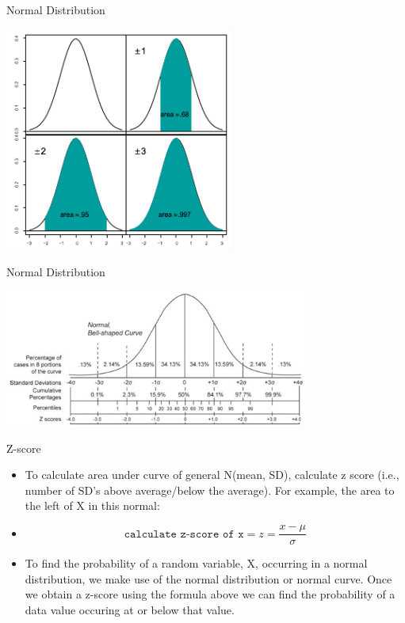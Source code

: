 \documentclass[14pt]{beamer}\usepackage[]{graphicx}\usepackage[]{color}
\begin{document}
\begin{frame}[fragile]{Normal Distribution}

\includegraphics[width=7.5cm]{chapters/chapter6/ext_figure/norm2.png}

\end{frame}

\begin{frame}[fragile]{Normal Distribution}

\includegraphics[width=10cm]{chapters/chapter6/ext_figure/norm3.png}

\end{frame}

\begin{frame}[fragile]{Z-score}

{\small{
\begin{itemize}
\item<1-> To calculate area under curve of general N(mean, SD), calculate z  score (i.e., number of SD's above average/below the average).  For example, the area to  the left of X in this normal:

\item<2-> 
\begin{equation*}
  \texttt{calculate z-score of x} = z = \frac{x - \mu}{\sigma} 
\end{equation*}

\item<3-> To find the probability of a random variable, X, occurring in a  normal distribution, we make use of the normal distribution or  normal curve. Once we obtain a z-score using the formula  above we can find the probability of a data value occuring at or  below that value.
\end{itemize}
}}
\end{frame}
\end{document}
